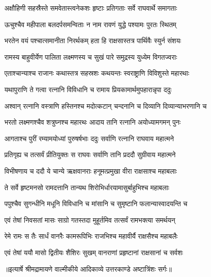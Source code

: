 \twolineshloka
{अक्षौहिणी सहस्रैस्ते समवेतास्त्वनेकशः}
{हृष्टाः प्रतिगताः सर्वे राघवार्थे समागताः} %

\twolineshloka
{ऊचुश्चैव महीपाला बलदर्पसमन्विताः}
{न नाम रावणं युद्धे पश्यामः पुरतः स्थितम्} %

\twolineshloka
{भरतेन वयं पश्चात्समानीता निरर्थकम्}
{हता हि राक्षसास्तत्र पार्थिवैः स्युर्न संशयः} %

\twolineshloka
{रामस्य बाहुवीर्येण पालिता लक्ष्मणस्य च}
{सुखं पारे समुद्रस्य युध्येम विगतज्वराः} %

\twolineshloka
{एताश्चान्याश्च राजानः कथास्तत्र सहस्रशः}
{कथयन्तः स्वराष्ट्राणि विविशुस्ते महारथाः} %

\twolineshloka
{यथापुराणि ते गत्वा रत्नानि विविधानि च}
{रामाय प्रियकामार्थमुपहारान्नृपा ददुः} %

\twolineshloka
{अश्वान् रत्नानि वस्त्राणि हस्तिनश्च मदोत्कटान्}
{चन्दनानि च दिव्यानि दिव्यान्याभरणानि च} %

\twolineshloka
{भरतो लक्ष्मणश्चैव शत्रुघ्नश्च महारथः}
{आदाय तानि रत्नानि अयोध्यामगमन् पुनः} %

\twolineshloka
{आगताश्च पुरीं रम्यामयोध्यां पुरुषर्षभाः}
{ददुः सर्वाणि रत्नानि राघवाय महात्मने} %

\twolineshloka
{प्रतिगृह्य च तत्सर्वं प्रीतियुक्तः स राघवः}
{सर्वाणि तानि प्रददौ सुग्रीवाय महात्मने} %

\twolineshloka
{विभीषणाय च ददौ ये चान्ये ऋक्षवानराः}
{हनूमत्प्रमुखा वीरा राक्षसाश्च महाबलाः} %

\twolineshloka
{ते सर्वे हृष्टमनसो रामदत्तानि तान्यथ}
{शिरोभिर्धारयामासुर्बाहुभिश्च महाबलाः} %

\twolineshloka
{पपुश्चैव सुगन्धीनि मधूनि विविधानि च}
{मांसानि च सुमृष्टानि फलान्यास्वादयन्ति च} %

\twolineshloka
{एवं तेषां निवसतां मासः साग्रो गतस्तदा}
{मुहूर्तमिव तत्सर्वं रामभक्त्या समर्थयन्} %

\twolineshloka
{रेमे रामः स तैः सार्धं वानरैः कामरूपिभिः}
{राजभिश्च महावीर्यै राक्षसैश्च महाबलैः} %

\twolineshloka
{एवं तेषां ययौ मासो द्वितीयः शैशिरः सुखम्}
{वानराणां प्रहृष्टानां राक्षसानां च सर्वशः} %


{॥इत्यार्षे श्रीमद्रामायणे वाल्मीकीये आदिकाव्ये उत्तरकाण्डे अष्टात्रिंशः सर्गः॥}



